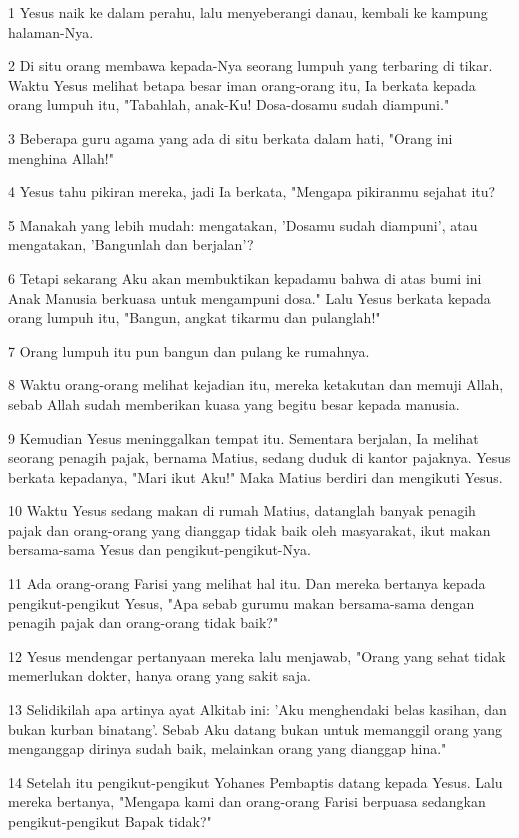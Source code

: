 \par 1 Yesus naik ke dalam perahu, lalu menyeberangi danau, kembali ke kampung halaman-Nya.
\par 2 Di situ orang membawa kepada-Nya seorang lumpuh yang terbaring di tikar. Waktu Yesus melihat betapa besar iman orang-orang itu, Ia berkata kepada orang lumpuh itu, "Tabahlah, anak-Ku! Dosa-dosamu sudah diampuni."
\par 3 Beberapa guru agama yang ada di situ berkata dalam hati, "Orang ini menghina Allah!"
\par 4 Yesus tahu pikiran mereka, jadi Ia berkata, "Mengapa pikiranmu sejahat itu?
\par 5 Manakah yang lebih mudah: mengatakan, 'Dosamu sudah diampuni', atau mengatakan, 'Bangunlah dan berjalan'?
\par 6 Tetapi sekarang Aku akan membuktikan kepadamu bahwa di atas bumi ini Anak Manusia berkuasa untuk mengampuni dosa." Lalu Yesus berkata kepada orang lumpuh itu, "Bangun, angkat tikarmu dan pulanglah!"
\par 7 Orang lumpuh itu pun bangun dan pulang ke rumahnya.
\par 8 Waktu orang-orang melihat kejadian itu, mereka ketakutan dan memuji Allah, sebab Allah sudah memberikan kuasa yang begitu besar kepada manusia.
\par 9 Kemudian Yesus meninggalkan tempat itu. Sementara berjalan, Ia melihat seorang penagih pajak, bernama Matius, sedang duduk di kantor pajaknya. Yesus berkata kepadanya, "Mari ikut Aku!" Maka Matius berdiri dan mengikuti Yesus.
\par 10 Waktu Yesus sedang makan di rumah Matius, datanglah banyak penagih pajak dan orang-orang yang dianggap tidak baik oleh masyarakat, ikut makan bersama-sama Yesus dan pengikut-pengikut-Nya.
\par 11 Ada orang-orang Farisi yang melihat hal itu. Dan mereka bertanya kepada pengikut-pengikut Yesus, "Apa sebab gurumu makan bersama-sama dengan penagih pajak dan orang-orang tidak baik?"
\par 12 Yesus mendengar pertanyaan mereka lalu menjawab, "Orang yang sehat tidak memerlukan dokter, hanya orang yang sakit saja.
\par 13 Selidikilah apa artinya ayat Alkitab ini: 'Aku menghendaki belas kasihan, dan bukan kurban binatang'. Sebab Aku datang bukan untuk memanggil orang yang menganggap dirinya sudah baik, melainkan orang yang dianggap hina."
\par 14 Setelah itu pengikut-pengikut Yohanes Pembaptis datang kepada Yesus. Lalu mereka bertanya, "Mengapa kami dan orang-orang Farisi berpuasa sedangkan pengikut-pengikut Bapak tidak?"
